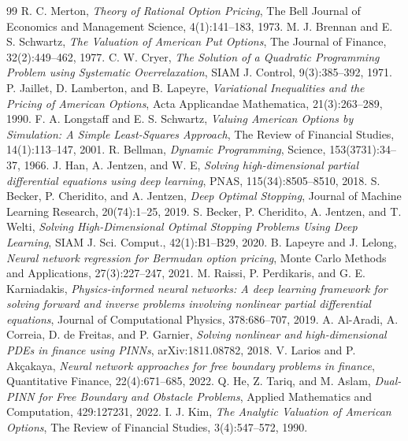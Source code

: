 \documentclass[11pt,a4paper]{article}
\begin{document}
\begin{thebibliography}{99}
 R. C. Merton, \emph{Theory of Rational Option Pricing}, The Bell Journal of Economics and Management Science, 4(1):141--183, 1973.
 M. J. Brennan and E. S. Schwartz, \emph{The Valuation of American Put Options}, The Journal of Finance, 32(2):449--462, 1977.
 C. W. Cryer, \emph{The Solution of a Quadratic Programming Problem using Systematic Overrelaxation}, SIAM J. Control, 9(3):385--392, 1971.
 P. Jaillet, D. Lamberton, and B. Lapeyre, \emph{Variational Inequalities and the Pricing of American Options}, Acta Applicandae Mathematica, 21(3):263--289, 1990.
 F. A. Longstaff and E. S. Schwartz, \emph{Valuing American Options by Simulation: A Simple Least-Squares Approach}, The Review of Financial Studies, 14(1):113--147, 2001.
 R. Bellman, \emph{Dynamic Programming}, Science, 153(3731):34--37, 1966.
 J. Han, A. Jentzen, and W. E, \emph{Solving high-dimensional partial differential equations using deep learning}, PNAS, 115(34):8505--8510, 2018.
 S. Becker, P. Cheridito, and A. Jentzen, \emph{Deep Optimal Stopping}, Journal of Machine Learning Research, 20(74):1--25, 2019.
 S. Becker, P. Cheridito, A. Jentzen, and T. Welti, \emph{Solving High-Dimensional Optimal Stopping Problems Using Deep Learning}, SIAM J. Sci. Comput., 42(1):B1--B29, 2020.
 B. Lapeyre and J. Lelong, \emph{Neural network regression for Bermudan option pricing}, Monte Carlo Methods and Applications, 27(3):227--247, 2021.
 M. Raissi, P. Perdikaris, and G. E. Karniadakis, \emph{Physics-informed neural networks: A deep learning framework for solving forward and inverse problems involving nonlinear partial differential equations}, Journal of Computational Physics, 378:686--707, 2019.
 A. Al-Aradi, A. Correia, D. de Freitas, and P. Garnier, \emph{Solving nonlinear and high-dimensional PDEs in finance using PINNs}, arXiv:1811.08782, 2018.
 V. Larios and P. Ak\c{c}akaya, \emph{Neural network approaches for free boundary problems in finance}, Quantitative Finance, 22(4):671--685, 2022.
 Q. He, Z. Tariq, and M. Aslam, \emph{Dual-PINN for Free Boundary and Obstacle Problems}, Applied Mathematics and Computation, 429:127231, 2022.
 I. J. Kim, \emph{The Analytic Valuation of American Options}, The Review of Financial Studies, 3(4):547--572, 1990.

\end{thebibliography}
\end{document}
